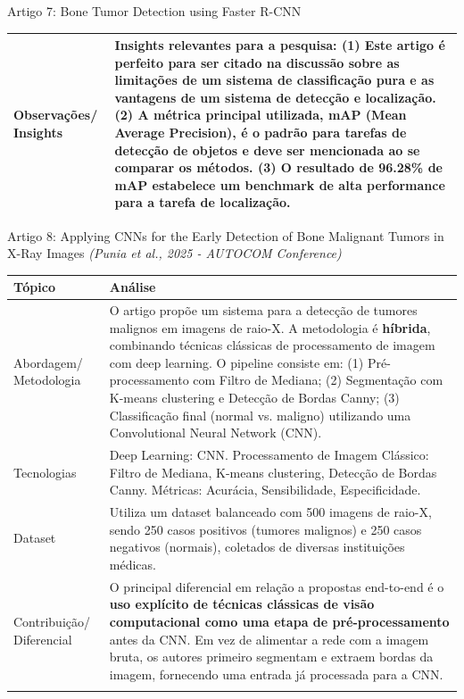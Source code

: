 \documentclass[12pt, a4paper]{article}
\begin{document}
\begin{fichabox}{Artigo 7: Bone Tumor Detection using Faster R-CNN}
\begin{longtable}{@{} B L{10.5cm} @{}}
    Observações/ Insights & \textbf{Insights relevantes para a pesquisa:} (1) Este artigo é perfeito para ser citado na discussão sobre as limitações de um sistema de classificação pura e as vantagens de um sistema de detecção e localização. (2) A métrica principal utilizada, \textbf{mAP (Mean Average Precision)}, é o padrão para tarefas de detecção de objetos e deve ser mencionada ao se comparar os métodos. (3) O resultado de 96.28\% de mAP estabelece um benchmark de alta performance para a tarefa de localização. \\
    
    \bottomrule
\end{longtable}
\end{fichabox}

\begin{fichabox}{Artigo 8: Applying CNNs for the Early Detection of Bone Malignant Tumors in X-Ray Images}
\textit{(Punia et al., 2025 - AUTOCOM Conference)}

\begin{longtable}{@{} B L{10.5cm} @{}}
    \toprule
    \textbf{Tópico} & \textbf{Análise} \\
    \midrule
    \endhead
    
    Abordagem/ Metodologia & O artigo propõe um sistema para a detecção de tumores malignos em imagens de raio-X. A metodologia é \textbf{híbrida}, combinando técnicas clássicas de processamento de imagem com deep learning. O pipeline consiste em: (1) Pré-processamento com Filtro de Mediana; (2) Segmentação com K-means clustering e Detecção de Bordas Canny; (3) Classificação final (normal vs. maligno) utilizando uma Convolutional Neural Network (CNN). \\
    \addlinespace
    
    Tecnologias & Deep Learning: CNN. Processamento de Imagem Clássico: Filtro de Mediana, K-means clustering, Detecção de Bordas Canny. Métricas: Acurácia, Sensibilidade, Especificidade. \\
    \addlinespace
    
    Dataset & Utiliza um dataset balanceado com 500 imagens de raio-X, sendo 250 casos positivos (tumores malignos) e 250 casos negativos (normais), coletados de diversas instituições médicas. \\
    \addlinespace
    
    Contribuição/ Diferencial & O principal diferencial em relação a propostas end-to-end é o \textbf{uso explícito de técnicas clássicas de visão computacional como uma etapa de pré-processamento} antes da CNN. Em vez de alimentar a rede com a imagem bruta, os autores primeiro segmentam e extraem bordas da imagem, fornecendo uma entrada já processada para a CNN. \\
    \addlinespace
    

\end{longtable}
\end{fichabox}
\end{document}
